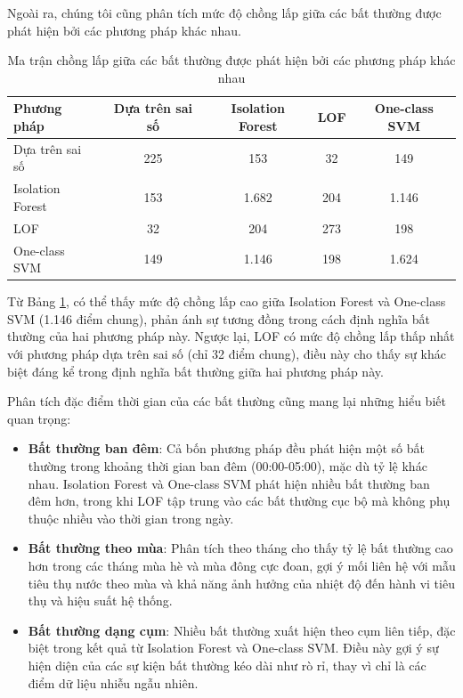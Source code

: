 Ngoài ra, chúng tôi cũng phân tích mức độ chồng lấp giữa các bất thường được phát hiện bởi các phương pháp khác nhau.

\begin{table}[htbp]
    \centering
    \begin{tabular}{|l|c|c|c|c|}
        \hline
        \textbf{Phương pháp} & \textbf{Dựa trên sai số} & \textbf{Isolation Forest} & \textbf{LOF} & \textbf{One-class SVM} \\
        \hline
        Dựa trên sai số & 225 & 153 & 32 & 149 \\
        \hline
        Isolation Forest & 153 & 1.682 & 204 & 1.146 \\
        \hline
        LOF & 32 & 204 & 273 & 198 \\
        \hline
        One-class SVM & 149 & 1.146 & 198 & 1.624 \\
        \hline
    \end{tabular}
    \caption{Ma trận chồng lấp giữa các bất thường được phát hiện bởi các phương pháp khác nhau}
    \label{tab:anomaly_overlap_matrix}
\end{table}

Từ Bảng \ref{tab:anomaly_overlap_matrix}, có thể thấy mức độ chồng lấp cao giữa Isolation Forest và One-class SVM (1.146 điểm chung), phản ánh sự tương đồng trong cách định nghĩa bất thường của hai phương pháp này. Ngược lại, LOF có mức độ chồng lấp thấp nhất với phương pháp dựa trên sai số (chỉ 32 điểm chung), điều này cho thấy sự khác biệt đáng kể trong định nghĩa bất thường giữa hai phương pháp này.

Phân tích đặc điểm thời gian của các bất thường cũng mang lại những hiểu biết quan trọng:

\begin{itemize}
    \item \textbf{Bất thường ban đêm}: Cả bốn phương pháp đều phát hiện một số bất thường trong khoảng thời gian ban đêm (00:00-05:00), mặc dù tỷ lệ khác nhau. Isolation Forest và One-class SVM phát hiện nhiều bất thường ban đêm hơn, trong khi LOF tập trung vào các bất thường cục bộ mà không phụ thuộc nhiều vào thời gian trong ngày.
    
    \item \textbf{Bất thường theo mùa}: Phân tích theo tháng cho thấy tỷ lệ bất thường cao hơn trong các tháng mùa hè và mùa đông cực đoan, gợi ý mối liên hệ với mẫu tiêu thụ nước theo mùa và khả năng ảnh hưởng của nhiệt độ đến hành vi tiêu thụ và hiệu suất hệ thống.
    
    \item \textbf{Bất thường dạng cụm}: Nhiều bất thường xuất hiện theo cụm liên tiếp, đặc biệt trong kết quả từ Isolation Forest và One-class SVM. Điều này gợi ý sự hiện diện của các sự kiện bất thường kéo dài như rò rỉ, thay vì chỉ là các điểm dữ liệu nhiễu ngẫu nhiên.
\end{itemize}

